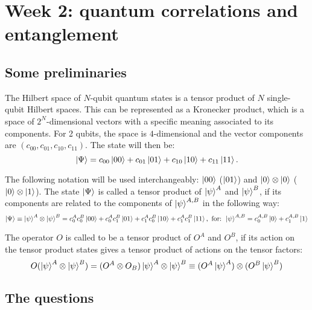 \documentclass[11pt, a4paper, tightenlines, notitlepage]{revtex4-1}
\begin{document}
\section*{Week 2: quantum correlations and entanglement}

\subsection*{Some preliminaries}

The Hilbert space of $N$-qubit quantum states is a tensor product of $N$ single-qubit Hilbert spaces. This can be represented as a Kronecker product, which is a space of $2^N$-dimensional vectors with a specific meaning associated to its components. For 2 qubits, the space is $4$-dimensional and the vector components are $\left(c_{00},c_{01},c_{10},c_{11}\right)$. The state will then be:
\begin{equation}
\ket{\Psi}=c_{00}\ket{00}+c_{01}\ket{01}+c_{10}\ket{10}+c_{11}\ket{11}.
\end{equation}

The following notation will be used interchangeably: $\ket{00}$ ($\ket{01}$) and $\ket{0}\otimes\ket{0}$ ($\ket{0}\otimes\ket{1}$). The state $\ket{\Psi}$ is called a tensor product of $\ket{\psi}^A$ and $\ket{\psi}^B$, if its components are related to the components of $\ket{\psi}^{A,B}$ in the following way:
\begin{equation}
\ket{\Psi}\equiv\ket{\psi}^A\otimes\ket{\psi}^B=c^A_{0}c^B_{0}\ket{00}+c^A_{0}c^B_{1}\ket{01}+c^A_{1}c^B_{0}\ket{10}+c^A_{1}c^B_{1}\ket{11}, \textrm{ for: } \ket{\psi}^{A,B}=c^{A,B}_{0}\ket{0}+c^{A,B}_{1}\ket{1}
\end{equation}

The operator $O$ is called to be a tensor product of $O^A$ and $O^B$, if its action on the tensor product states gives a tensor product of actions on the tensor factors:
\begin{equation}
O(\ket{\psi}^A\otimes\ket{\psi}^B)= (O^A\otimes O_B)\ket{\psi}^A\otimes\ket{\psi}^B\equiv (O^A\ket{\psi}^A)\otimes(O^B\ket{\psi}^B)
\end{equation}

\subsection*{The questions}
\end{document}

